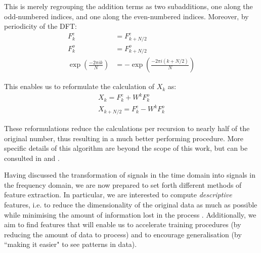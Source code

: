 \documentclass[../main.tex]{subfiles} \label{chapter_soa}
\begin{document}
\par This is merely regrouping the addition terms as two subadditions, one along the odd-numbered indices, and one along the even-numbered indices. Moreover, by periodicity of the DFT:
\begin{align*}
F^e_k &= F^e_{k+N/2}\\
F^o_k &= F^o_{k+N/2}\\
\exp{\left(\frac{-2\pi ik}{N}\right)} &= -\exp {\left(\frac{-2\pi i(k+N/2)}{N} \right)}
\end{align*}
\par This enables us to reformulate the calculation of $X_k$ as:
\begin{align*}
X_k = F^e_k + W^kF^o_k\\
X_{k+N/2} = F^e_k - W^kF^o_k
\end{align*}
\par These reformulations reduce the calculations per recursion to nearly half of the original number, thus resulting in a much better performing procedure. More specific details of this algorithm are beyond the scope of this work, but can be consulted in \cite{Smith2011} and \cite{Cooley1965}.
\par Having discussed the transformation of signals in the time domain into signals in the frequency domain, we are now prepared to set forth different methods of feature extraction. In particular, we are interested to compute \emph{descriptive} features, i.e. to reduce the dimensionality of the original data as much as possible while minimising the amount of information lost in the process \cite{hastie2008}. Additionally, we aim to find features that will enable us to accelerate training procedures (by reducing the amount of data to process) and to encourage generalisation (by ``making it easier" to see patterns in data).
\end{document}
